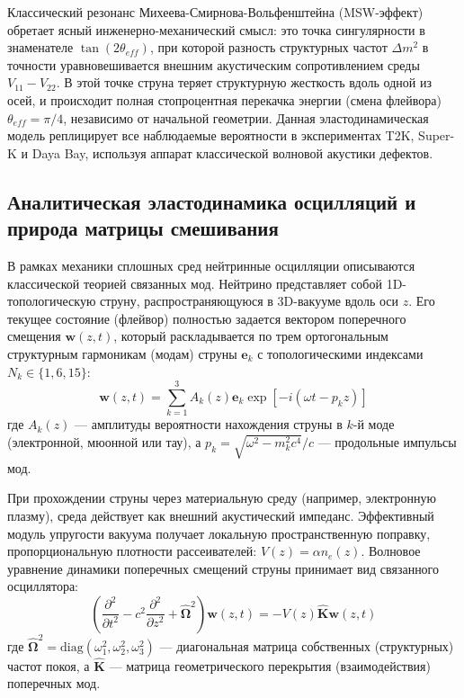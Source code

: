 \documentclass[12pt,a4paper]{article}
\begin{document}
	Классический резонанс Михеева-Смирнова-Вольфенштейна (MSW-эффект) обретает ясный инженерно-механический смысл: это точка сингулярности в знаменателе $\tan(2\theta_{eff})$, при которой разность структурных частот $\Delta m^2$ в точности уравновешивается внешним акустическим сопротивлением среды $V_{11} - V_{22}$. В этой точке струна теряет структурную жесткость вдоль одной из осей, и происходит полная стопроцентная перекачка энергии (смена флейвора) $\theta_{eff} = \pi/4$, независимо от начальной геометрии. 
	Данная эластодинамическая модель реплицирует все наблюдаемые вероятности в экспериментах T2K, Super-K и Daya Bay, используя аппарат классической волновой акустики дефектов.
	
	\subsection{Аналитическая эластодинамика осцилляций и природа матрицы смешивания}
	В рамках механики сплошных сред нейтринные осцилляции описываются классической теорией связанных мод. Нейтрино представляет собой 1D-топологическую струну, распространяющуюся в 3D-вакууме вдоль оси $z$. Его текущее состояние (флейвор) полностью задается вектором поперечного смещения $\mathbf{w}(z,t)$, который раскладывается по трем ортогональным структурным гармоникам (модам) струны $\mathbf{e}_k$ с топологическими индексами $N_k \in \{1, 6, 15\}$:
	\begin{equation}
		\mathbf{w}(z,t) = \sum_{k=1}^3 A_k(z) \mathbf{e}_k \exp\left[-i(\omega t - p_k z)\right]
	\end{equation}
	где $A_k(z)$ — амплитуды вероятности нахождения струны в $k$-й моде (электронной, мюонной или тау), а $p_k = \sqrt{\omega^2 - m_k^2 c^4} / c$ — продольные импульсы мод.
	
	При прохождении струны через материальную среду (например, электронную плазму), среда действует как внешний акустический импеданс. Эффективный модуль упругости вакуума получает локальную пространственную поправку, пропорциональную плотности рассеивателей: $V(z) = \alpha n_e(z)$. 
	Волновое уравнение динамики поперечных смещений струны принимает вид связанного осциллятора:
	\begin{equation}
		\left( \frac{\partial^2}{\partial t^2} - c^2 \frac{\partial^2}{\partial z^2} + \hat{\mathbf{\Omega}}^2 \right) \mathbf{w}(z,t) = - V(z) \hat{\mathbf{K}} \mathbf{w}(z,t)
	\end{equation}
	где $\hat{\mathbf{\Omega}}^2 = \text{diag}(\omega_1^2, \omega_2^2, \omega_3^2)$ — диагональная матрица собственных (структурных) частот покоя, а $\hat{\mathbf{K}}$ — матрица геометрического перекрытия (взаимодействия) поперечных мод.
	
\end{document}

